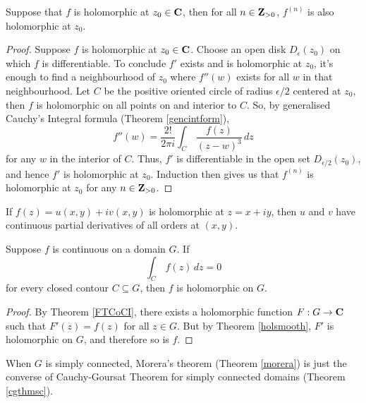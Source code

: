 \begin{theorem}\label{holsmooth}
Suppose that $f$ is holomorphic at $z_0 \in \mathbf C$, then for all $n\in \mathbf Z_{>0}$, $f^{(n)}$ is also holomorphic at $z_0$. 
\end{theorem}
\begin{proof}
Suppose $f$ is holomorphic at $z_0 \in \mathbf C$. Choose an open disk $D_\epsilon(z_0)$ on which $f$ is differentiable. To conclude $f'$ exists and is holomorphic at $z_0$, it's enough to find a neighbourhood of $z_0$ where $f''(w)$ exists for all $w$ in that neighbourhood. Let $C$ be the positive oriented circle of radius $\epsilon/2$ centered at $z_0$, then $f$ is holomorphic on all points on and interior to $C$. So, by generalised Cauchy's Integral formula (Theorem \ref{gencintform}),
\[f''(w) = \frac{2!}{2\pi i}\int_C\,\frac{f(z)}{(z - w)^3}\,dz\]
for any $w$ in the interior of $C$. Thus, $f'$ is differentiable in the open set $D_{\epsilon/2}(z_0)$, and hence $f'$ is holomorphic at $z_0$. Induction then gives us that $f^{(n)}$ is holomorphic at $z_0$ for any $n\in \mathbf Z_{>0}$.
\end{proof}

\medskip

\begin{corollary}
If $f(z) = u(x,y) + iv(x,y)$ is holomorphic at $z = x + iy$, then $u$ and $v$ have continuous partial derivatives of all orders at $(x,y)$. 
\end{corollary}

\medskip

\begin{theorem}\label{morera}
Suppose $f$ is continuous on a domain $G$. If
\[\int_C\,f(z)\,dz = 0\]
for every closed contour $C \subseteq G$, then $f$ is holomorphic on $G$. 
\end{theorem}
\begin{proof}
By Theorem \ref{FTCoCI}, there exists a holomorphic function $F:G \to \mathbf C$ such that $F'(z) = f(z)$ for all $z \in G$. But by Theorem \ref{holsmooth}, $F'$ is holomorphic on $G$, and therefore so is $f$. 
\end{proof}

\medskip

\begin{remark}
When $G$ is simply connected, Morera's theorem (Theorem \ref{morera}) is just the converse of Cauchy-Goursat Theorem for simply connected domains (Theorem \ref{cgthmsc}).
\end{remark}

